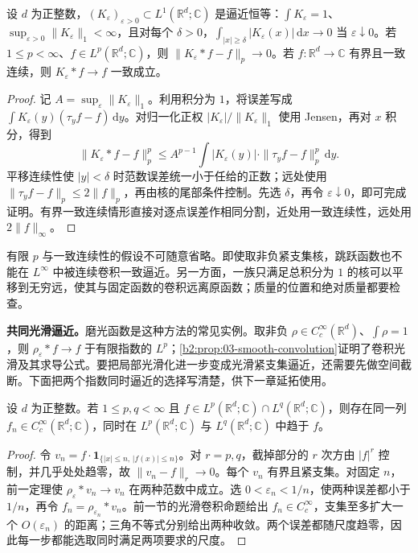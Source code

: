 \begin{theorem}\label{b2:thm:03-approximate-identity}
设 \(d\) 为正整数，\((K_\varepsilon)_{\varepsilon>0}\subset L^1(\mathbb R^d;\mathbb C)\) 是逼近恒等：\(\int K_\varepsilon=1\)、\(\sup_{\varepsilon>0}\|K_\varepsilon\|_1<\infty\)，且对每个 \(\delta>0\)，\(\int_{|x|\geq\delta}|K_\varepsilon(x)|\,\mathrm dx\to0\) 当 \(\varepsilon\downarrow0\)。若 \(1\leq p<\infty\)、\(f\in L^p(\mathbb R^d;\mathbb C)\)，则 \(\|K_\varepsilon*f-f\|_p\to0\)。若 \(f\colon\mathbb R^d\to\mathbb C\) 有界且一致连续，则 \(K_\varepsilon*f\to f\) 一致成立。
\end{theorem}
\begin{proof}
记 \(A=\sup_\varepsilon\|K_\varepsilon\|_1\)。利用积分为 \(1\)，将误差写成 \(\int K_\varepsilon(y)(\tau_yf-f)\,\mathrm{d}y\)。对归一化正权 \(|K_\varepsilon|/\|K_\varepsilon\|_1\) 使用 Jensen，再对 \(x\) 积分，得到
\[
 \|K_\varepsilon*f-f\|_p^p
 \leq A^{p-1}\int|K_\varepsilon(y)|\cdot\|\tau_yf-f\|_p^p\,\mathrm{d}y.
\]
平移连续性使 \(|y|<\delta\) 时范数误差统一小于任给的正数；远处使用 \(\|\tau_yf-f\|_p\leq2\|f\|_p\)，再由核的尾部条件控制。先选 \(\delta\)，再令 \(\varepsilon\downarrow0\)，即可完成证明。有界一致连续情形直接对逐点误差作相同分割，近处用一致连续性，远处用 \(2\|f\|_\infty\)。
\end{proof}

有限 \(p\) 与一致连续性的假设不可随意省略。即使取非负紧支集核，跳跃函数也不能在 \(L^\infty\) 中被连续卷积一致逼近。另一方面，一族只满足总积分为 \(1\) 的核可以平移到无穷远，使其与固定函数的卷积远离原函数；质量的位置和绝对质量都要检查。

\ProseParagraphBreak

\textbf{共同光滑逼近。}磨光函数是这种方法的常见实例。取非负 \(\rho\in C_c^\infty(\mathbb R^d)\)、\(\int\rho=1\)，则 \(\rho_\varepsilon*f\to f\) 于有限指数的 \(L^p\)；\cref{b2:prop:03-smooth-convolution}证明了卷积光滑及其求导公式。要把局部光滑化进一步变成光滑紧支集逼近，还需要先做空间截断。下面把两个指数同时逼近的选择写清楚，供下一章延拓使用。

\begin{proposition}\label{b2:prop:03-common-smooth-density}
设 \(d\) 为正整数。若 \(1\leq p,q<\infty\) 且 \(f\in L^p(\mathbb R^d;\mathbb C)\cap L^q(\mathbb R^d;\mathbb C)\)，则存在同一列 \(f_n\in C_c^\infty(\mathbb R^d;\mathbb C)\)，同时在 \(L^p(\mathbb R^d;\mathbb C)\) 与 \(L^q(\mathbb R^d;\mathbb C)\) 中趋于 \(f\)。
\end{proposition}
\begin{proof}
令 \(v_n=f\cdot\mathbf1_{\{|x|\leq n,\,|f(x)|\leq n\}}\)。对 \(r=p,q\)，截掉部分的 \(r\) 次方由 \(|f|^r\) 控制，并几乎处处趋零，故 \(\|v_n-f\|_r\to0\)。每个 \(v_n\) 有界且紧支集。对固定 \(n\)，前一定理使 \(\rho_\varepsilon*v_n\to v_n\) 在两种范数中成立。选 \(0<\varepsilon_n<1/n\)，使两种误差都小于 \(1/n\)，再令 \(f_n=\rho_{\varepsilon_n}*v_n\)。前一节的光滑卷积命题给出 \(f_n\in C_c^\infty\)，支集至多扩大一个 \(O(\varepsilon_n)\) 的距离；三角不等式分别给出两种收敛。两个误差都随尺度趋零，因此每一步都能选取同时满足两项要求的尺度。
\end{proof}


